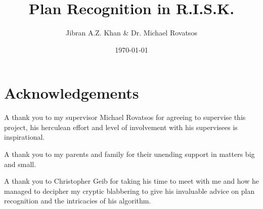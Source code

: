 \documentclass[parskip]{cs4rep}
\begin{document}
\title{Plan Recognition in R.I.S.K.}

\author{Jibran A.Z. Khan \& Dr. Michael Rovatsos}



\date{\today}


\maketitle

\section*{Acknowledgements}

A thank you to my supervisor Michael Rovatsos for agreeing to supervise this project, his herculean effort and level of involvement with his supervisees is inspirational.

A thank you to my parents and family for their unending support in matters big and small. 

A thank you to Christopher Geib for taking his time to meet with me and how he managed to decipher my cryptic blabbering to give his invaluable advice on plan recognition and the intricacies of his algorithm. 
\end{document}
